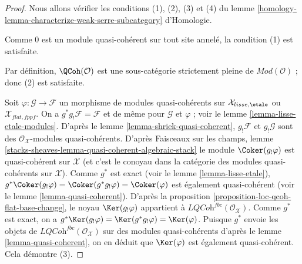 \begin{proof}
Nous allons vérifier les conditions (1), (2), (3) et (4) du
lemme \ref{homology-lemma-characterize-weak-serre-subcategory} d'Homologie.

\medskip\noindent
Comme $0$ est un module quasi-cohérent sur tout site annelé, la condition (1)
est satisfaite.

\medskip\noindent
Par définition, $\QCoh(\mathcal{O})$
est une sous-catégorie strictement pleine de $\textit{Mod}(\mathcal{O})$ ; donc (2) est satisfaite.

\medskip\noindent
Soit $\varphi : \mathcal{G} \to \mathcal{F}$ un morphisme de modules
quasi-cohérents sur $\mathcal{X}_{lisse,\etale}$ ou $\mathcal{X}_{flat,fppf}$.
On a $g^*g_!\mathcal{F} = \mathcal{F}$ et de même pour
$\mathcal{G}$ et $\varphi$ ; voir le lemme \ref{lemma-lisse-etale-modules}.
D'après le lemme \ref{lemma-shriek-quasi-coherent},
$g_!\mathcal{F}$ et $g_!\mathcal{G}$ sont des
$\mathcal{O}_\mathcal{X}$-modules quasi-cohérents. D'après Faisceaux sur les champs, lemme
\ref{stacks-sheaves-lemma-quasi-coherent-algebraic-stack}
le module $\Coker(g_!\varphi)$ est quasi-cohérent
sur $\mathcal{X}$ (et c'est le conoyau dans la catégorie
des modules quasi-cohérents sur $\mathcal{X}$).
Comme $g^*$ est exact (voir le lemme \ref{lemma-lisse-etale}),
$g^*\Coker(g_!\varphi) = \Coker(g^*g_!\varphi) = \Coker(\varphi)$
est également quasi-cohérent (voir le lemme \ref{lemma-quasi-coherent}).
D'après la proposition \ref{proposition-loc-qcoh-flat-base-change},
le noyau $\Ker(g_!\varphi)$ appartient à
$\textit{LQCoh}^{fbc}(\mathcal{O}_\mathcal{X})$.
Comme $g^*$ est exact, on a
$g^*\Ker(g_!\varphi) = \Ker(g^*g_!\varphi) = \Ker(\varphi)$.
Puisque $g^*$ envoie les objets de
$\textit{LQCoh}^{fbc}(\mathcal{O}_\mathcal{X})$ sur des modules
quasi-cohérents d'après le lemme \ref{lemma-quasi-coherent}, on en déduit que
$\Ker(\varphi)$ est également quasi-cohérent. Cela démontre (3).


\end{proof}
